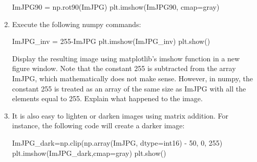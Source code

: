 \documentclass[11pt]{article}
\newenvironment{Shaded}{}{}
\newcommand{\DecValTok}[1]{\textcolor[rgb]{0.25,0.63,0.44}{{#1}}}
\newcommand{\StringTok}[1]{\textcolor[rgb]{0.25,0.44,0.63}{{#1}}}
\newcommand{\NormalTok}[1]{{#1}}
\newcommand{\OperatorTok}[1]{\textcolor[rgb]{0.40,0.40,0.40}{{#1}}}
\begin{document}
\begin{enumerate}
\begin{Shaded}
\begin{tcolorbox}[breakable, size=fbox, boxrule=1pt, pad at break*=1mm,colback=cellbackground, colframe=cellborder]
  \begin{Highlighting}[]
\NormalTok{ImJPG90 }\OperatorTok{=}\NormalTok{ np.rot90(ImJPG)}
\NormalTok{plt.imshow(ImJPG90, cmap}\OperatorTok{=}\StringTok{\textquotesingle{}gray\textquotesingle{}}\NormalTok{)}
\end{Highlighting}
\end{tcolorbox}
\end{Shaded}
\item
  Execute the following numpy commands:

\begin{Shaded}
\begin{tcolorbox}[breakable, size=fbox, boxrule=1pt, pad at break*=1mm,colback=cellbackground, colframe=cellborder]
  \begin{Highlighting}[]
\NormalTok{ImJPG\_inv }\OperatorTok{=} \DecValTok{255}\OperatorTok{{-}}\NormalTok{ImJPG}
\NormalTok{plt.imshow(ImJPG\_inv)}
\NormalTok{plt.show()}
\end{Highlighting}
\end{tcolorbox}
\end{Shaded}

  Display the resulting image using matplotlib's imshow function in a
  new figure window. Note that the constant 255 is subtracted from the
  array ImJPG, which mathematically does not make sense. However, in
  numpy, the constant 255 is treated as an array of the same size as
  ImJPG with all the elements equal to 255. Explain what happened to the
  image.
\item
  It is also easy to lighten or darken images using matrix addition. For
  instance, the following code will create a darker image:

\begin{Shaded}
\begin{tcolorbox}[breakable, size=fbox, boxrule=1pt, pad at break*=1mm,colback=cellbackground, colframe=cellborder]
  \begin{Highlighting}[]
\NormalTok{ImJPG\_dark}\OperatorTok{=}\NormalTok{np.clip(np.array(ImJPG, dtype}\OperatorTok{=}\StringTok{\textquotesingle{}int16\textquotesingle{}}\NormalTok{) }\OperatorTok{{-}} \DecValTok{50}\NormalTok{, }\DecValTok{0}\NormalTok{, }\DecValTok{255}\NormalTok{)}
\NormalTok{plt.imshow(ImJPG\_dark,cmap}\OperatorTok{=}\StringTok{\textquotesingle{}gray\textquotesingle{}}\NormalTok{)}
\NormalTok{plt.show()}
\end{Highlighting}
\end{tcolorbox}
\end{Shaded}


\end{enumerate}
\end{document}
